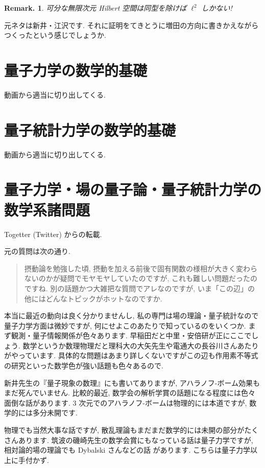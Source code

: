 \documentclass[openany, a4paper, oneside]{book}
\theoremstyle{break}
\theoremstyle{breakdefn}
\newtheorem{rem}[thm]{Remark.}
\begin{document}
\begin{rem}
 可分な無限次元 Hilbert 空間は同型を除けば $\ell^2$ しかない!
\end{rem}

元ネタは新井・江沢\cite{AraiEzawa1, AraiEzawa2}です.
それに証明をてきとうに増田\cite{HisayaMasuda1}の方向に書きかえながらつくったという感じでしょうか.
\chapter{量子力学の数学的基礎}
\label{sec-7-14}

動画から適当に切り出してくる.
\chapter{量子統計力学の数学的基礎}
\label{sec-7-15}

動画から適当に切り出してくる.
\chapter{量子力学・場の量子論・量子統計力学の数学系諸問題}
\label{sec-7-16}

Togetter (Twitter) からの転載.

元の質問は次の通り.
\begin{quote}
摂動論を勉強した頃, 摂動を加える前後で固有関数の様相が大きく変わらないのかが疑問でモヤモヤしていたのですが,
これも難しい問題だったのですね.
別の話題かつ大雑把な質問でアレなのですが, いま「この辺」の他にはどんなトピックがホットなのですか.
\end{quote}

本当に最近の動向は良く分かりませんし,
私の専門は場の理論・量子統計なので量子力学方面は微妙ですが, 何にせよこのあたりで知っているのをいくつか.
まず観測・量子情報関係が色々あります.
早稲田だと中里・安倍研が正にここでしょう.
数学というか数理物理だと理科大の大矢先生や電通大の長谷川さんあたりがやっています.
具体的な問題はあまり詳しくないですがこの辺も作用素不等式の研究といった数学色が強い話題も色々あるので.

新井先生の『量子現象の数理』\cite{AsaoArai4}にも書いてありますが,
アハラノフ-ボーム効果もまだ死んでいません.
比較的最近, 数学会の解析学賞の話題になる程度には色々面倒な話があります.
3 次元でのアハラノフ-ボームは物理的には本道ですが, 数学的には多分未開です.

物理でも当然大事な話ですが, 散乱理論もまだまだ数学的には未開の部分がたくさんあります.
筑波の磯崎先生の数学会賞にもなっている話は量子力学ですが,
相対論的場の理論でも Dybalski さんなどの話 \cite{WojciechDybalski1} があります.
こちらは量子力学以上に手付かず.
\end{document}
